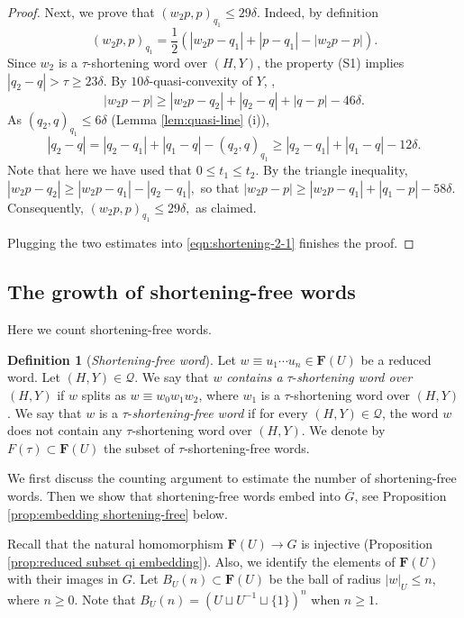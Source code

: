 \documentclass[leqno,a4paper,10pt]{amsart}
\theoremstyle{plain}
\theoremstyle{definition}
\newtheorem{df}[thm]{Definition}
\theoremstyle{remark}
\newcommand{\F}{\mathbf{F}}
\newcommand{\scrQ}{\mathscr{Q}}
\let\le\leqslant
\let\ge\geqslant
\begin{document}
\begin{proof}
Next, we prove that $(w_2p,p)_{q_1}\le 29\delta$. Indeed, by definition 
		$$(w_2p,p)_{q_1}=\frac{1}{2}(|w_2p-q_1|+|p-q_1|-|w_2p-p|).$$
		Since $w_2$ is a $\tau$-shortening word over $(H,Y)$, the property (S1) implies 
		$|q_2-q|>\tau\ge 23\delta.$
		By $10\delta$-quasi-convexity of $Y$, \cite[Chapitre 2, Proposition 2.1]{coornaert_geometrie_1990},
		$$|w_2p-p|\ge |w_2p-q_2|+|q_2-q|+|q-p|-46\delta.$$
As $(q_2,q)_{q_1}\le 6\delta	$ (Lemma \ref{lem:quasi-line} (i)),
		$$|q_2-q|= |q_2-q_1|+|q_1-q|-(q_2,q)_{q_1}\ge |q_2-q_1|+|q_1-q|-12 \delta.$$
		Note that here we have used that $0\le t_1\le t_2$. By the triangle inequality,
		$
		|w_2p-q_2|\ge |w_2p-q_1|-|q_2-q_1|,
		$
so that 
		$|w_2p-p|\ge |w_2p-q_1|+|q_1-p|-58\delta.$
		Consequently,
$(w_2p,p)_{q_1}\le 29\delta,$ as claimed.

		
Plugging the two estimates into \eqref{eqn:shortening-2-1} finishes the proof. 
\end{proof}



\subsection{The growth of shortening-free words}
\label{subsec:counting}
Here we count shortening-free words. 

\begin{df}[\emph{Shortening-free word}]
	
	Let $w\equiv u_1\cdots u_n\in \F(U)$ be a reduced word. Let $(H,Y)\in \scrQ$. We say that $w$ \emph{contains a} $\tau$-\emph{shortening word over} $(H,Y)$ if $w$ splits as $w\equiv w_0w_1w_2$, where $w_1$ is a $\tau$-shortening word over $(H,Y)$. We say that $w$ is a $\tau$-\emph{shortening-free word} if for every $(H,Y)\in\scrQ$, the word $w$ does not contain any $\tau$-shortening word over $(H,Y)$. We denote by $F(\tau)\subset \F(U)$ the subset of $\tau$-shortening-free words. 
\end{df}

We first discuss the counting argument to estimate the number of shortening-free words. Then we show that shortening-free words embed into $\overline{G}$, see Proposition \ref{prop:embedding shortening-free} below. 

Recall that the natural homomorphism $\F(U)\to G$ is injective (Proposition \ref{prop:reduced subset qi embedding}). Also, we identify the elements of $\F(U)$ with their images in $G$. Let $B_U(n)\subset \F(U)$ be the ball of radius $|w|_U\le n$, where $n \ge 0$. Note that $B_U(n)=(U \sqcup U^{-1}\sqcup\{1\})^n$ when $n \ge 1$.
\end{document}
